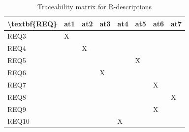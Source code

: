 \documentclass[fontsize=12pt,paper=letter,twoside]{scrartcl}
\begin{document}
\begin{table}[!ht]
	\centering
	\begin{tabular}{|l|l|l|l|l|l|l|l|}
		\hline
		\textbackslash{}textbf\{REQ\} & at1 & at2 & at3 & at4 & at5 & at6 & at7 \\ \hline
		REQ3                          & X   &     &     &     &     &     &     \\ \hline
		REQ4                          &     & X   &     &     &     &     &     \\ \hline
		REQ5                          &     &     &     &     & X   &     &     \\ \hline
		REQ6                          &     &     & X   &     &     &     &     \\ \hline
		REQ7                          &     &     &     &     &     & X   &     \\ \hline
		REQ8                          &     &     &     &     &     &     & X   \\ \hline
		REQ9                          &     &     &     &     &     & X   &     \\ \hline
		REQ10                         &     &     &     & X   &     &     &     \\ \hline
	\end{tabular}
	\caption{Traceability matrix for R-descriptions}
	\label{tbl:at}
\end{table}
\end{document}
